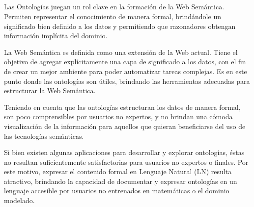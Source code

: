 \ \\
\ \\
\label{pagresum}
\\ \\
Las Ontologías juegan un rol clave en la formación de la Web Semántica. Permiten representar el conocimiento de manera formal, brindándole un significado bien definido a los datos y permitiendo que razonadores obtengan información implícita del dominio. 

La Web Semántica es definida como una extensión de la Web actual. Tiene el objetivo de agregar explícitamente una capa de significado a los datos, con el fin de crear un mejor ambiente para poder automatizar tareas complejas. Es en este punto donde las ontologías son útiles, brindando las herramientas adecuadas para estructurar la Web Semántica. 



Teniendo en cuenta que las ontologías estructuran los datos de manera formal, son poco comprensibles por usuarios no expertos, y no brindan una cómoda visualización de la información para aquellos que quieran beneficiarse del uso de las tecnologías semánticas.

Si bien existen algunas aplicaciones para  desarrollar y explorar ontologías, éstas no resultan suficientemente satisfactorias para usuarios no expertos o finales. 
Por este motivo, expresar el contenido formal en Lenguaje Natural (LN) resulta atractivo, brindando la capacidad de documentar y expresar ontologías en un lenguaje accesible por usuarios no entrenados en matemáticas o el dominio modelado. 

